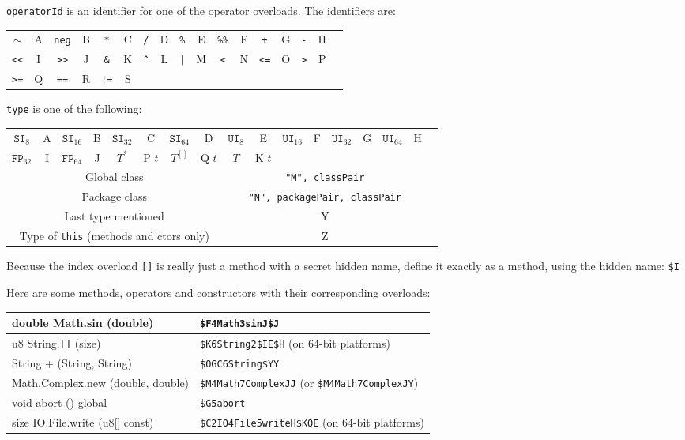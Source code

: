 \documentclass{article}
\newcommand{\R}[1]{\mathtt{#1}}
\begin{document}
\texttt{operatorId} is an identifier for one of the operator overloads. The
identifiers are:
\newcommand{\QQ}[2]{\texttt{#1} & #2 &}
\begin{center}
\begin{tabular}{|cc|cc|cc|cc|cc|cc|cc|cc|l}
\cline{1-16}
\QQ{$\sim$}{A}  \QQ{neg}{B} \QQ{*}{C}  \QQ{/}{D}  \QQ{\%}{E}  \QQ{\%\%}{F}  \QQ{+}{G}  \QQ{-}{H} \\
\QQ{<<}{I}      \QQ{>>}{J}  \QQ{\&}{K} \QQ{\^}{L} \QQ{|}{M}   \QQ{<}{N}     \QQ{<=}{O} \QQ{>}{P} \\
\QQ{>=}{Q}      \QQ{==}{R}  \QQ{!=}{S} &&&&&&&&&& \\
\cline{1-16}
\end{tabular}
\end{center}

\texttt{type} is one of the following:
\begin{center}
\begin{tabular}{|cc|cc|cc|cc|cc|cc|cc|cc|l}
\cline{1-16}
$\R{SI}_8$ & A &
$\R{SI}_{16}$ & B &
$\R{SI}_{32}$ & C &
$\R{SI}_{64}$ & D &
$\R{UI}_8$ & E &
$\R{UI}_{16}$ & F &
$\R{UI}_{32}$ & G &
$\R{UI}_{64}$ & H & \\
$\R{FP}_{32}$ & I &
$\R{FP}_{64}$ & J &
$T^*$ & P $t$ &
$T^{[]}$ & Q $t$ &
$\overline{T}$ & K $t$ &&&&&& \\
\cline{1-16}
\multicolumn{8}{|c|}{Global class} &
\multicolumn{8}{c|}{\texttt{"M", classPair}} \\
\multicolumn{8}{|c|}{Package class} &
\multicolumn{8}{c|}{\texttt{"N", packagePair, classPair}} \\
\multicolumn{8}{|c|}{Last type mentioned} &
\multicolumn{8}{c|}{Y} \\
\multicolumn{8}{|c|}{Type of \texttt{this} (methods and ctors only)} &
\multicolumn{8}{c|}{Z} \\
\cline{1-16}
\end{tabular}
\end{center}

Because the index overload \texttt{[]} is really just a method with a
secret hidden name, define it exactly as a method, using the hidden name:
\texttt{\$I} %

Here are some methods, operators and constructors with their corresponding
overloads:
\begin{center}
\begin{tabular}{|l|l|}
\hline
double Math.sin (double) & \texttt{\$F4Math3sinJ\$J} \\ \hline
u8 String.\texttt{[]} (size) & \texttt{\$K6String2\$IE\$H} (on 64-bit platforms) \\ \hline
String + (String, String) & \texttt{\$OGC6String\$YY} \\ \hline
Math.Complex.new (double, double) & \texttt{\$M4Math7ComplexJJ} (or \texttt{\$M4Math7ComplexJY}) \\ \hline
void abort () global & \texttt{\$G5abort} \\ \hline
size IO.File.write (u8[] const) & \texttt{\$C2IO4File5writeH\$KQE} (on 64-bit platforms) \\ \hline
\end{tabular}
\end{center}
\end{document}
